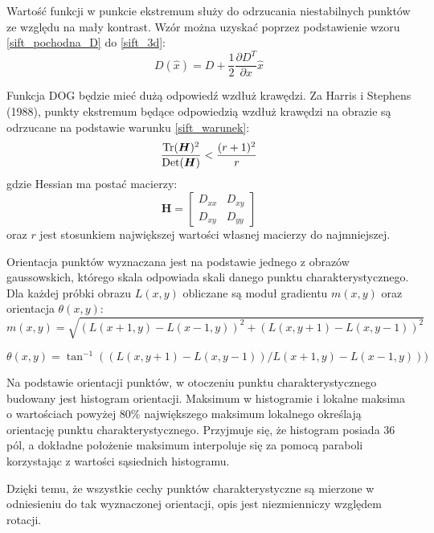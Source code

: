 Wartość funkcji w punkcie ekstremum służy do odrzucania niestabilnych punktów ze względu na mały kontrast. Wzór można uzyskać poprzez podstawienie wzoru \ref{sift_pochodna_D} do \ref{sift_3d}:
\begin{equation} 
\label{sift_Dx} 
D(\hat{x}) = D + \frac{1}{2} \frac{\partial D^T}{\partial x} \hat{x}
\end{equation}

Funkcja DOG będzie mieć dużą odpowiedź wzdłuż krawędzi. Za Harris i Stephens (1988), punkty ekstremum będące odpowiedzią wzdłuż krawędzi na obrazie są odrzucane na podstawie warunku \ref{sift_warunek}:
\begin{equation} 
\label{sift_warunek} 
\frac{\operatorname{Tr}(\boldsymbol{H})^2}{\operatorname{Det}(\boldsymbol{H})} < \frac{(r+1)^2}{r}
\end{equation} gdzie Hessian ma postać macierzy:
\begin{equation} 
\label{sift_hessian} 
\boldsymbol{H} = 
	\begin{bmatrix}
		D_{xx} & D_{xy} \\
		D_{xy} & D_{yy}
	\end{bmatrix}
\end{equation} oraz $r$ jest stosunkiem największej wartości własnej macierzy do najmniejszej.

Orientacja punktów wyznaczana jest na podstawie jednego z obrazów gaussowskich, którego skala odpowiada skali danego punktu charakterystycznego. Dla każdej próbki obrazu $L(x, y)$ obliczane są moduł gradientu $m(x, y)$ oraz orientacja $\theta(x, y)$:
\begin{equation} 
\label{sift_gradient_magnitude} 
m(x, y) = \sqrt{(L(x + 1, y) - L(x - 1, y))^2 + (L(x, y + 1) - L(x, y - 1))^2}
\end{equation}

\begin{equation} 
\label{sift_orientation} 
\theta(x, y) = \tan^{-1}((L(x, y + 1) - L(x, y - 1))/L(x + 1, y) - L(x - 1, y)))
\end{equation}

Na podstawie orientacji punktów, w otoczeniu punktu charakterystycznego budowany jest histogram orientacji. Maksimum w histogramie i lokalne maksima o wartościach powyżej 80\% największego maksimum lokalnego określają orientację punktu charakterystycznego. Przyjmuje się, że histogram posiada 36 pól, a dokładne położenie maksimum interpoluje się za pomocą paraboli korzystając z wartości sąsiednich histogramu.

Dzięki temu, że wszystkie cechy punktów charakterystyczne są mierzone w odniesieniu do tak wyznaczonej orientacji, opis jest niezmienniczy względem rotacji.

